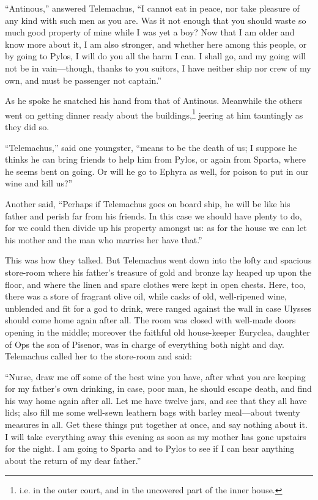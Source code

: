“Antinous,” answered Telemachus, “I cannot eat in peace, nor take pleasure of
any kind with such men as you are. Was it not enough that you should waste so
much good property of mine while I was yet a boy? Now that I am older and know
more about it, I am also stronger, and whether here among this people, or by
going to Pylos, I will do you all the harm I can. I shall go, and my going will
not be in vain—though, thanks to you suitors, I have neither ship nor crew of
my own, and must be passenger not captain.”

As he spoke he snatched his hand from that of Antinous. Meanwhile the others
went on getting dinner ready about the buildings,\footnote{i.e. in the outer court, and in the uncovered part of the inner house.} jeering at him tauntingly as they did
so.

“Telemachus,” said one youngster, “means to be the death of us; I suppose he
thinks he can bring friends to help him from Pylos, or again from Sparta, where
he seems bent on going. Or will he go to Ephyra as well, for poison to put in
our wine and kill us?”

Another said, “Perhaps if Telemachus goes on board ship, he will be like his
father and perish far from his friends. In this case we should have plenty to
do, for we could then divide up his property amongst us: as for the house we
can let his mother and the man who marries her have that.”

This was how they talked. But Telemachus went down into the lofty and spacious
store-room where his father’s treasure of gold and bronze lay heaped up upon
the floor, and where the linen and spare clothes were kept in open chests.
Here, too, there was a store of fragrant olive oil, while casks of old,
well-ripened wine, unblended and fit for a god to drink, were ranged against
the wall in case Ulysses should come home again after all. The room was closed
with well-made doors opening in the middle; moreover the faithful old
house-keeper Euryclea, daughter of Ops the son of Pisenor, was in charge of
everything both night and day. Telemachus called her to the store-room and
said:

“Nurse, draw me off some of the best wine you have, after what you are keeping
for my father’s own drinking, in case, poor man, he should escape death, and
find his way home again after all. Let me have twelve jars, and see that they
all have lids; also fill me some well-sewn leathern bags with barley meal—about
twenty measures in all. Get these things put together at once, and say nothing
about it. I will take everything away this evening as soon as my mother has
gone upstairs for the night. I am going to Sparta and to Pylos to see if I can
hear anything about the return of my dear father.”

